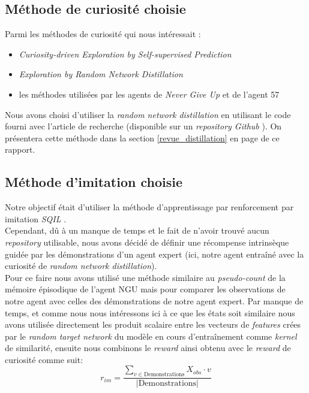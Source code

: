 \documentclass[a4paper,12pt]{report}
\begin{document}
\subsection{Méthode de curiosité choisie}
Parmi les méthodes de curiosité qui nous intéressait :
\begin{itemize}
    \item \textit{Curiosity-driven Exploration by Self-supervised Prediction} \cite{curiosity}
    \item \textit{Exploration by Random Network Distillation} \cite{distillation}
    \item les méthodes utilisées par les agents de \textit{Never Give Up} \cite{ngu} et de l'agent 57 \cite{agent57}
\end{itemize}
Nous avons choisi d'utiliser la \textit{random network distillation} en utilisant le code fourni avec l'article de recherche (disponible sur un \textit{repository Github} \cite{distillation_github}). On présentera cette méthode dans la section \ref{revue_distillation} en page \pageref{revue_distillation} de ce rapport.

\subsection{Méthode d'imitation choisie}
Notre objectif était d'utiliser la méthode d'apprentissage par renforcement par imitation \textit{SQIL} \cite{sqil}.\\
\indent Cependant, dû à un manque de temps et le fait de n'avoir trouvé aucun \textit{repository} utilisable, nous avons décidé de définir une récompense intrinsèque guidée par les démonstrations d'un agent expert (ici, notre agent entraîné avec la curiosité de \textit{random network distillation}).\\
\indent Pour ce faire nous avons utilisé une méthode similaire au \textit{pseudo-count} de la mémoire épisodique de l'agent NGU mais pour comparer les observations de notre agent avec celles des démonstrations de notre agent expert. Par manque de temps, et comme nous nous intéressons ici à ce que les états soit similaire nous avons utilisée directement les produit scalaire entre les vecteurs de \textit{features} crées par le \textit{random target network} du modèle en cours d'entraînement comme \textit{kernel} de similarité, ensuite nous combinons le \textit{reward} ainsi obtenu avec le \textit{reward} de curiosité comme suit:
\begin{equation} r_{im} = \frac{\sum_{v\in \text{Demonstrations}} X_{obs}\cdot v}{|\text{Demonstrations}|} \end{equation}
\end{document}
